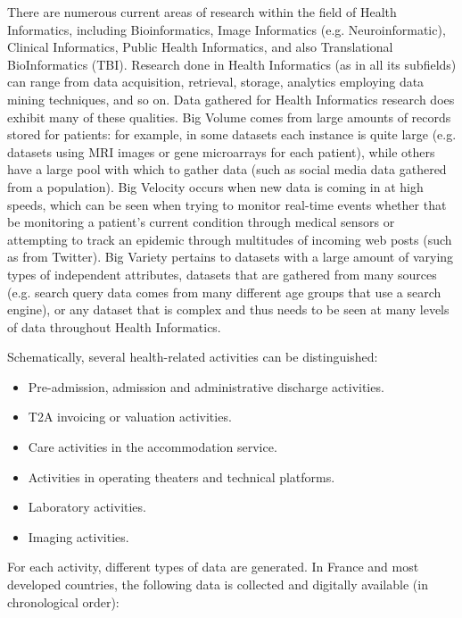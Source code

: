   \newpage
There are numerous current areas of research within the field of Health Informatics, including Bioinformatics, Image Informatics (e.g. Neuroinformatic), Clinical Informatics, Public Health Informatics, and also Translational BioInformatics (TBI). Research done in Health Informatics (as in all its subfields) can range from data acquisition, retrieval, storage, analytics employing data mining techniques, and so on.
\bigbreak
Data gathered for Health Informatics research does exhibit many of these qualities. Big Volume comes from large amounts of records stored for patients: for example, in some datasets each instance is quite large (e.g. datasets using MRI images or gene microarrays for each patient), while others have a large pool with which to gather data (such as social media data gathered from a population). Big Velocity occurs when new data is coming in at high speeds, which can be seen when trying to monitor real-time events whether that be monitoring a patient’s current condition through medical sensors or attempting to track an epidemic through multitudes of incoming web posts (such as from Twitter). Big Variety pertains to datasets with a large amount of varying types of independent attributes, datasets that are gathered from many sources (e.g. search query data comes from many different age groups that use a search engine), or any dataset that is complex and thus needs to be seen at many levels of data throughout Health Informatics.

\newpage
Schematically, several health-related activities can be distinguished\cite{martigneneVisualisationUnifieeDonnees}:
\begin{itemize}
  \item Pre-admission, admission and administrative discharge activities.
  \item T2A invoicing or valuation activities.
  \item Care activities in the accommodation service.
  \item Activities in operating theaters and technical platforms.
  \item Laboratory activities.
  \item Imaging activities.
\end{itemize}

For each activity, different types of data are generated. In France and most developed countries, the following data is collected and digitally available (in chronological order)\cite{ATIHAgenceTechnique,boracle2009detection}:


